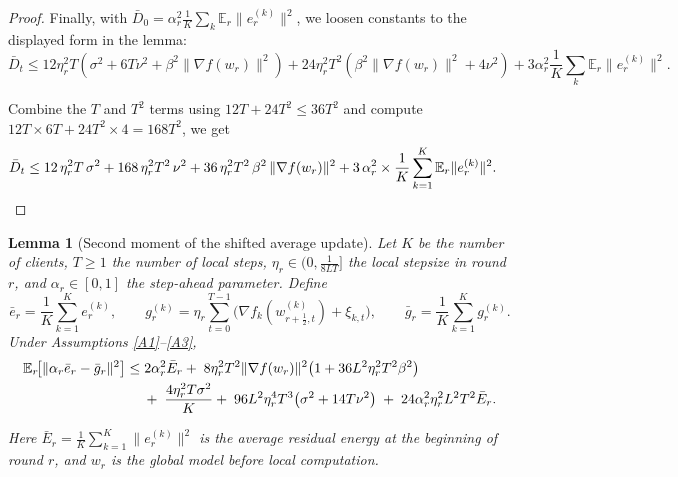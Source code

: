 \documentclass{article} %
\newcommand{\E}{\mathbb{E}}
\newtheorem{lemma}{Lemma}
\begin{document}
\begin{proof}
Finally, with \(\bar D_0 = \alpha_r^{2} \tfrac{1}{K} \sum_k \mathbb{E}_r \|e_r^{(k)}\|^{2}\), we loosen constants to the displayed form in the lemma:
\[
\bar D_t
\le
12\eta_r^{2}T
   \left(\sigma^{2} + 6T\nu^{2} + \beta^{2}\|\nabla f(w_r)\|^{2}\right)
+ 24\eta_r^{2}T^{2}
   \left(\beta^{2}\|\nabla f(w_r)\|^{2} + 4\nu^{2}\right)
+ 3\alpha_r^{2}\frac{1}{K} \sum_k \mathbb{E}_r \|e_r^{(k)}\|^{2}.
\]

Combine the $T$ and $T^2$ terms using $12T+24T^2\le 36T^2$ and compute $12T\times 6T+24T^2\times 4=168T^2$, we get
\begin{align}
\bar D_t
&\le
12\,\eta_r^{2}T\,\sigma^{2}
+168\,\eta_r^{2}T^{2}\,\nu^{2}
+36\,\eta_r^{2}T^{2}\,\beta^{2}\,\|\nabla f(w_r)\|^{2}
+3\,\alpha_r^{2}\times \frac{1}{K}\sum_{k=1}^{K}\E_r\|e_r^{(k)}\|^{2}.  \notag
\end{align}

\end{proof}



\begin{lemma}[Second moment of the shifted average update]
\label{lem:step-ahead-moment-fixed}
Let $K$ be the number of clients, $T\ge 1$ the number of local steps,
$\eta_r\in(0,\frac{1}{8LT}]$ the local stepsize in round $r$, and
$\alpha_r\in[0,1]$ the step-ahead parameter.
Define
\[
\bar e_r = \frac1K\sum_{k=1}^K e_r^{(k)},\qquad
g_r^{(k)} = \eta_r\sum_{t=0}^{T-1}
           \bigl(\nabla f_k(w_{r+\frac12,t}^{(k)})+\xi_{k,t}\bigr),\qquad
\bar g_r = \frac1K\sum_{k=1}^K g_r^{(k)}.
\]
Under Assumptions \ref{A1}--\ref{A3},
\begin{align}
\E_r\!\bigl[\|\alpha_r\bar e_r-\bar g_r\|^{2}\bigr]
&\le 
2\alpha_r^{2}\bar E_r + \;8\eta_r^{2}T^{2}\|\nabla f(w_r)\|^{2}\bigl(1+36L^{2}\eta_r^{2}T^{2}\beta^{2}\bigr) \notag\\
&\quad
\;+\;\frac{4\eta_r^{2}T\sigma^{2}}{K}+\;96L^{2}\eta_r^{4}T^{3}\bigl(\sigma^{2}+14T\nu^{2}\bigr)
\;+\;24\alpha_r^{2}\eta_r^{2}L^{2}T^{2}\bar E_r.
\end{align}

Here $\displaystyle
      \bar E_r = \frac1K\sum_{k=1}^K \|e_r^{(k)}\|^{2}$ is the average
residual energy at the beginning of round $r$, and $w_r$ is the global
model before local computation.
\end{lemma}
\end{document}
